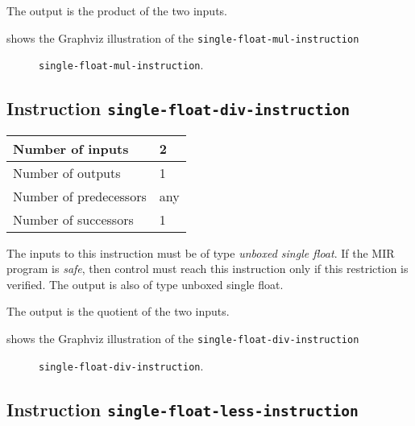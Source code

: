 The output is the product of the two inputs.

 shows the Graphviz illustration of the
\texttt{single-float-mul-instruction}

\begin{figure}
\begin{center}
\end{center}
\caption{\label{fig-single-float-mul-instruction}
\texttt{single-float-mul-instruction}.}
\end{figure}

\subsection{Instruction \texttt{single-float-div-instruction}}
\label{mir-instruction-single-float-div}

\begin{tabular}{|l|l|}
\hline
Number of inputs & 2\\
\hline
Number of outputs & 1\\
\hline
Number of predecessors & any\\
\hline
Number of successors & 1\\
\hline
\end{tabular}

The inputs to this instruction must be of type \emph{unboxed single
  float}.  If the MIR program is \emph{safe}, then control must reach
this instruction only if this restriction is verified.  The output is
also of type unboxed single float.

The output is the quotient of the two inputs.

 shows the Graphviz illustration of the
\texttt{single-float-div-instruction}

\begin{figure}
\begin{center}
\end{center}
\caption{\label{fig-single-float-div-instruction}
\texttt{single-float-div-instruction}.}
\end{figure}

\subsection{Instruction \texttt{single-float-less-instruction}}
\label{mir-instruction-single-float-less}

